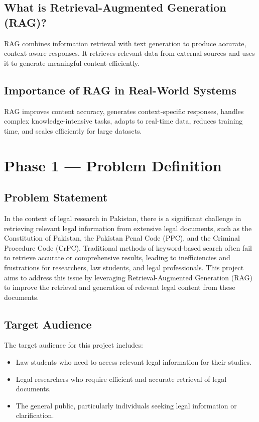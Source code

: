\documentclass{article}
\begin{document}
\subsection{What is Retrieval-Augmented Generation (RAG)?}
RAG combines information retrieval with text generation to produce accurate, context-aware responses. It retrieves relevant data from external sources and uses it to generate meaningful content efficiently.

\subsection{Importance of RAG in Real-World Systems}
RAG improves content accuracy, generates context-specific responses, handles complex knowledge-intensive tasks, adapts to real-time data, reduces training time, and scales efficiently for large datasets.

\section{Phase 1 — Problem Definition}

\subsection{Problem Statement}
In the context of legal research in Pakistan, there is a significant challenge in retrieving relevant legal information from extensive legal documents, such as the Constitution of Pakistan, the Pakistan Penal Code (PPC), and the Criminal Procedure Code (CrPC). Traditional methods of keyword-based search often fail to retrieve accurate or comprehensive results, leading to inefficiencies and frustrations for researchers, law students, and legal professionals. This project aims to address this issue by leveraging Retrieval-Augmented Generation (RAG) to improve the retrieval and generation of relevant legal content from these documents.

\subsection{Target Audience}
The target audience for this project includes:
\begin{itemize}
    \item Law students who need to access relevant legal information for their studies.
    \item Legal researchers who require efficient and accurate retrieval of legal documents.
    \item The general public, particularly individuals seeking legal information or clarification.
\end{itemize}
\end{document}
